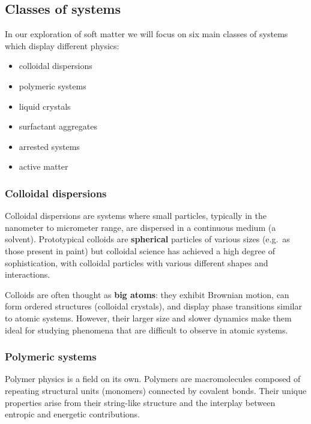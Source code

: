 \documentclass[
  letterpaper,
  enabledeprecatedfontcommands]{report}
\providecommand{\tightlist}{%
  \setlength{\itemsep}{0pt}\setlength{\parskip}{0pt}}
\begin{document}
\subsection{Classes of systems}\label{classes-of-systems}

In our exploration of soft matter we will focus on six main classes of
systems which display different physics:

\begin{itemize}
\tightlist
\item
  colloidal dispersions
\item
  polymeric systems
\item
  liquid crystals
\item
  surfactant aggregates
\item
  arrested systems
\item
  active matter
\end{itemize}

\subsubsection*{Colloidal dispersions}\label{colloidal-dispersions}

Colloidal dispersions are systems where small particles, typically in
the nanometer to micrometer range, are dispersed in a continuous medium
(a solvent). Prototypical colloids are \textbf{spherical} particles of
various sizes (e.g.~as those present in paint) but colloidal science has
achieved a high degree of sophistication, with colloidal particles with
various different shapes and interactions.

Colloids are often thought as \textbf{big atoms}: they exhibit Brownian
motion, can form ordered structures (colloidal crystals), and display
phase transitions similar to atomic systems. However, their larger size
and slower dynamics make them ideal for studying phenomena that are
difficult to observe in atomic systems.

\subsubsection*{Polymeric systems}\label{polymeric-systems}

Polymer physics is a field on its own. Polymers are macromolecules
composed of repeating structural units (monomers) connected by covalent
bonds. Their unique properties arise from their string-like structure
and the interplay between entropic and energetic contributions.
\end{document}
